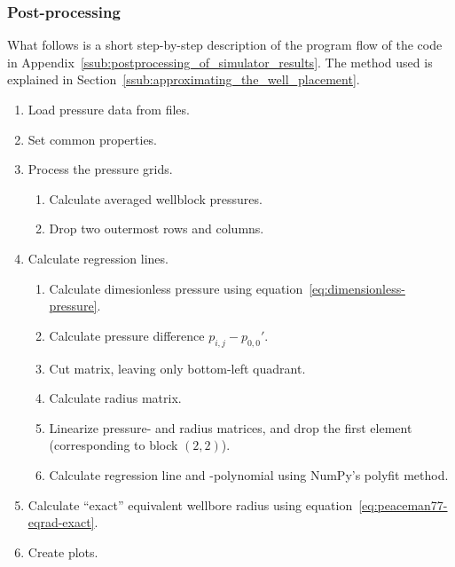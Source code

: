 \subsubsection{Post-processing} %
\label{ssub:post_processing}
What follows is a short step-by-step description of the program flow of the code in Appendix~\ref{ssub:postprocessing_of_simulator_results}. The method used is explained in Section~\ref{ssub:approximating_the_well_placement}.
\begin{enumerate}
    \item Load pressure data from files.
    \item Set common properties.
    \item Process the pressure grids.
    \begin{enumerate}
        \item Calculate averaged wellblock pressures.
        \item Drop two outermost rows and columns.
    \end{enumerate}
    \item Calculate regression lines.
    \begin{enumerate}
        \item Calculate dimesionless pressure using equation~\eqref{eq:dimensionless-pressure}.
        \item Calculate pressure difference $p_{i,j}-p_{0,0}'$.
        \item Cut matrix, leaving only bottom-left quadrant.
        \item Calculate radius matrix.
        \item Linearize pressure- and radius matrices, and drop the first element (corresponding to block $(2,2)$).
        \item Calculate regression line and -polynomial using NumPy's polyfit method.
    \end{enumerate}
    \item Calculate ``exact'' equivalent wellbore radius using equation~\eqref{eq:peaceman77-eqrad-exact}.
    \item Create plots.
\end{enumerate}


